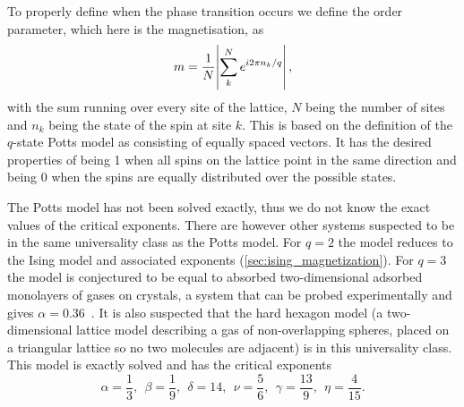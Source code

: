 \documentclass[11pt, a4paper]{report} %
\begin{document}
To properly define when the phase transition occurs we define the order parameter, which here is the magnetisation, as
\begin{equation}
	m = \frac{1}{N}\abs{\sum_k^N e^{i2\pi n_k / q}},
\end{equation}
with the sum running over every site of the lattice, \(N\) being the number of sites and \(n_k\) being the state of the spin at site \(k\).
This is based on the definition of the \(q\)-state Potts model as consisting of equally spaced vectors.
It has the desired properties of being 1 when all spins on the lattice point in the same direction and being 0 when the spins are equally distributed over the possible states.

The Potts model has not been solved exactly, thus we do not know the exact values of the critical exponents.
There are however other systems suspected to be in the same universality class as the Potts model.
For \(q=2\) the model reduces to the Ising model and associated exponents (\cref{sec:ising_magnetization}).
For \(q=3\) the model is conjectured to be equal to absorbed two-dimensional adsorbed monolayers of gases on crystals, a system that can be probed experimentally and gives \(\alpha = 0.36\)~\cite{binder:1981a}.
It is also suspected that the hard hexagon model (a two-dimensional lattice model describing a gas of non-overlapping spheres, placed on a triangular lattice so no two molecules are adjacent) is in this universality class.
This model is exactly solved and has the critical exponents~\cite{baxter:1989,wu:1982}
\begin{equation}\label{eq:potts_critical_exponents}
	\alpha = \frac{1}{3},\ \ \beta = \frac{1}{9},\ \ \delta = 14,\ \ \nu = \frac{5}{6},\ \ \gamma = \frac{13}{9},\ \ \eta = \frac{4}{15}.
\end{equation}
\end{document}
